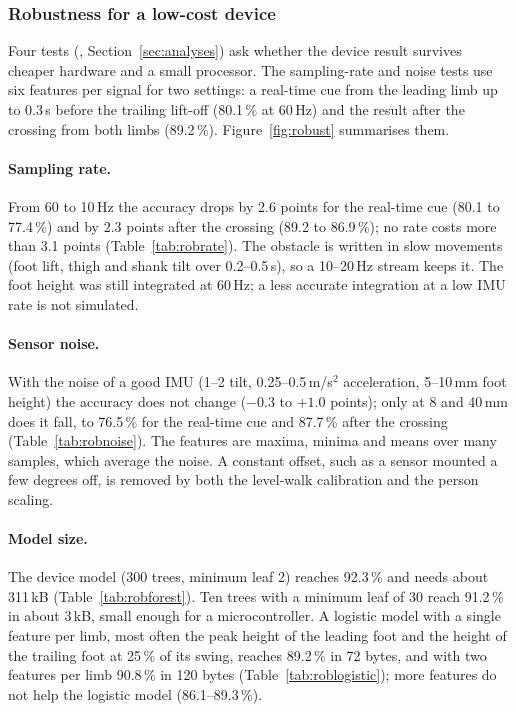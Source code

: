 \subsubsection{Robustness for a low-cost device}
\label{sec:res-robust}

Four tests (, Section~\ref{sec:analyses}) ask whether the device result survives cheaper hardware and a
small processor. The sampling-rate and noise tests use six features per signal for two settings: a real-time cue from the leading
limb up to 0.3\,s before the trailing lift-off (80.1\,\% at 60\,Hz) and the result after the crossing from both limbs (89.2\,\%).
Figure~\ref{fig:robust} summarises them.

\paragraph{Sampling rate.} From 60 to 10\,Hz the accuracy drops by 2.6 points for the real-time cue (80.1 to 77.4\,\%) and by
2.3 points after the crossing (89.2 to 86.9\,\%); no rate costs more than 3.1 points (Table~\ref{tab:robrate}). The obstacle is
written in slow movements (foot lift, thigh and shank tilt over 0.2--0.5\,s), so a 10--20\,Hz stream keeps it. The foot height was
still integrated at 60\,Hz; a less accurate integration at a low IMU rate is not simulated.

\paragraph{Sensor noise.} With the noise of a good IMU (1--2\textdegree{} tilt, 0.25--0.5\,m/s$^2$ acceleration, 5--10\,mm foot
height) the accuracy does not change ($-0.3$ to $+1.0$ points); only at 8\textdegree{} and 40\,mm does it fall, to 76.5\,\% for
the real-time cue and 87.7\,\% after the crossing (Table~\ref{tab:robnoise}). The features are maxima, minima and means over many
samples, which average the noise. A constant offset, such as a sensor mounted a few degrees off, is removed by both the level-walk
calibration and the person scaling.

\paragraph{Model size.} The device model (300 trees, minimum leaf 2) reaches 92.3\,\% and needs about 311\,kB
(Table~\ref{tab:robforest}). Ten trees with a minimum leaf of 30 reach 91.2\,\% in about 3\,kB, small enough for a
microcontroller. A logistic model with a single feature per limb, most often the peak height of the leading foot and the height of
the trailing foot at 25\,\% of its swing, reaches 89.2\,\% in 72 bytes, and with two features per limb 90.8\,\% in 120 bytes
(Table~\ref{tab:roblogistic}); more features do not help the logistic model (86.1--89.3\,\%).

